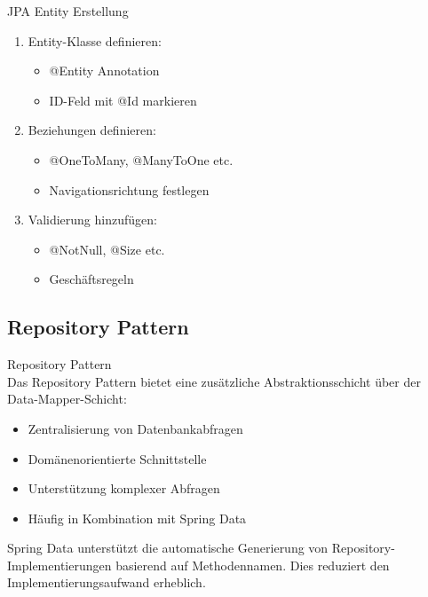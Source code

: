 \begin{KR}{JPA Entity Erstellung}
\begin{enumerate}
    \item Entity-Klasse definieren:
    \begin{itemize}
        \item @Entity Annotation
        \item ID-Feld mit @Id markieren
    \end{itemize}
    \item Beziehungen definieren:
    \begin{itemize}
        \item @OneToMany, @ManyToOne etc.
        \item Navigationsrichtung festlegen
    \end{itemize}
    \item Validierung hinzufügen:
    \begin{itemize}
        \item @NotNull, @Size etc.
        \item Geschäftsregeln
    \end{itemize}
\end{enumerate}
\end{KR}



\subsection{Repository Pattern}

\begin{concept}{Repository Pattern}\\
Das Repository Pattern bietet eine zusätzliche Abstraktionsschicht über der Data-Mapper-Schicht:
\begin{itemize}
    \item Zentralisierung von Datenbankabfragen
    \item Domänenorientierte Schnittstelle
    \item Unterstützung komplexer Abfragen
    \item Häufig in Kombination mit Spring Data
\end{itemize}
\end{concept}



\begin{remark}
Spring Data unterstützt die automatische Generierung von Repository-Implementierungen basierend auf Methodennamen. Dies reduziert den Implementierungsaufwand erheblich.
\end{remark}

